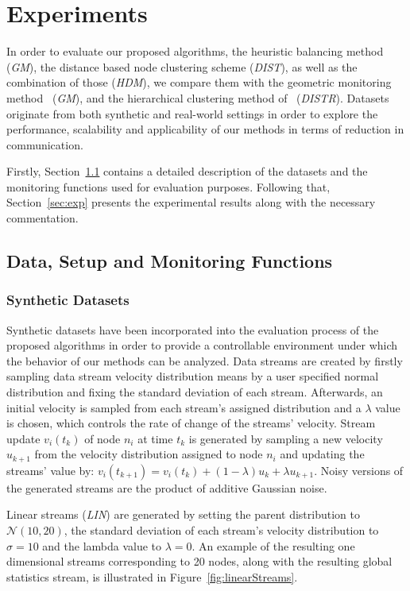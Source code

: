 \chapter{Experiments} \label{chap:exp}

In order to evaluate our proposed algorithms, the heuristic balancing method (\emph{GM}), the distance based node clustering scheme (\emph{DIST}), as well as the combination of those (\emph{HDM}), we compare them with the geometric monitoring method~\cite{Sharfman2006GM} (\emph{GM}), and the hierarchical clustering method of~\cite{Keren2014GMHetStreams} (\emph{DISTR}). Datasets originate from both synthetic and real-world settings in order to explore the performance, scalability and applicability of our methods in terms of reduction in communication.

Firstly, Section~\ref{sec:datasets} contains a detailed description of the datasets and the monitoring functions used for evaluation purposes. Following that, Section~\ref{sec:exp} presents the experimental results along with the necessary commentation.

\section{Data, Setup and Monitoring Functions} \label{sec:datasets}

\subsection{Synthetic Datasets}

Synthetic datasets have been incorporated into the evaluation process of the proposed algorithms in order to provide a controllable environment under which the behavior of our methods can be analyzed. Data streams are created by firstly sampling data stream velocity distribution means by a user specified normal distribution and fixing the standard deviation of each stream. Afterwards, an initial velocity is sampled from each stream's assigned distribution and a $\lambda$ value is chosen, which controls the rate of change of the streams' velocity. Stream update $v_i(t_k)$ of node $n_i$ at time $t_k$ is generated by sampling a new velocity $u_{k+1}$ from the velocity distribution assigned to node $n_i$ and updating the streams' value by: $v_i(t_{k+1})=v_i(t_k) + (1-\lambda)u_{k} + \lambda u_{k+1}$. Noisy versions of the generated streams are the product of additive Gaussian noise.

Linear streams (\emph{LIN}) are generated by setting the parent distribution to $\mathcal{N}(10,20)$, the standard deviation of each stream's velocity distribution to $\sigma=10$ and the lambda value to $\lambda=0$. An example of the resulting one dimensional streams corresponding to 20 nodes, along with the resulting global statistics stream, is illustrated in Figure~\ref{fig:linearStreams}.

